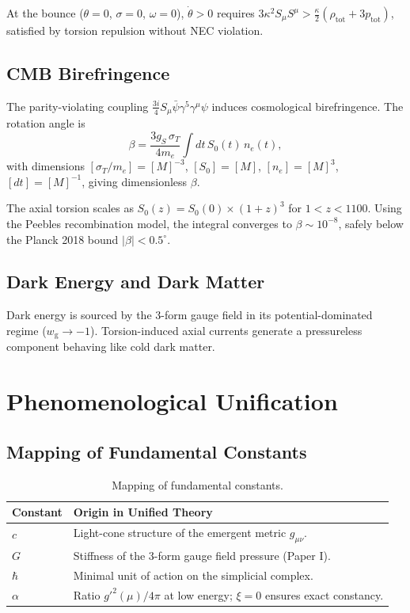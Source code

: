 \documentclass[twocolumn,prd,amsmath,amssymb]{revtex4-2}
\begin{document}
At the bounce ($\theta = 0$, $\sigma = 0$, $\omega = 0$), $\dot{\theta} > 0$ requires
$3\kappa^2 S_\mu S^\mu > \frac{\kappa}{2}(\rho_{\text{tot}} + 3p_{\text{tot}})$,
satisfied by torsion repulsion without NEC violation.

\subsection{CMB Birefringence}

The parity-violating coupling $\frac{3i}{4}S_\mu\bar\psi\gamma^5\gamma^\mu\psi$ induces
cosmological birefringence.  The rotation angle is
\begin{equation}
\beta = \frac{3g_S\,\sigma_T}{4m_e} \int dt\, S_0(t)\, n_e(t),
\label{eq:beta}
\end{equation}
with dimensions $[\sigma_T/m_e] = [M]^{-3}$, $[S_0] = [M]$, $[n_e] = [M]^3$,
$[dt] = [M]^{-1}$, giving dimensionless $\beta$.

The axial torsion scales as $S_0(z) = S_0(0) \times (1+z)^{3}$ for $1 < z < 1100$.
Using the Peebles recombination model, the integral converges to $\beta \sim 10^{-8}$,
safely below the Planck 2018 bound $|\beta| < 0.5^\circ$.

\subsection{Dark Energy and Dark Matter}

Dark energy is sourced by the 3-form gauge field in its potential-dominated regime
($w_{\text{g}} \to -1$).  Torsion-induced axial currents generate a pressureless
component behaving like cold dark matter.

\section{Phenomenological Unification}
\label{sec:pheno}

\subsection{Mapping of Fundamental Constants}

\begin{table}[h]
\centering
\begin{tabular}{ll}
Constant & Origin in Unified Theory \\
\hline
$c$      & Light-cone structure of the emergent metric $g_{\mu\nu}$. \\
$G$      & Stiffness of the 3-form gauge field pressure (Paper I). \\
$\hbar$ & Minimal unit of action on the simplicial complex. \\
$\alpha$ & Ratio $g'^2(\mu)/4\pi$ at low energy; $\xi=0$ ensures exact constancy.
\end{tabular}
\caption{Mapping of fundamental constants.}
\label{tab:constants}
\end{table}
\end{document}
